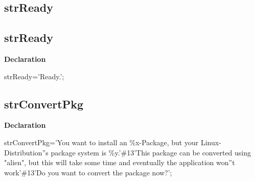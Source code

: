 \documentclass{report}
\newif\ifpdf
\begin{document}
\subsection*{\large{\textbf{strReady}}\normalsize\hspace{1ex}\hrulefill}
\else
\subsection*{strReady}
\fi
\label{trstrings-strReady}
\begin{list}{}{
\setlength{\itemindent}{0cm}
\setlength{\listparindent}{0cm}
\setlength{\leftmargin}{\evensidemargin}
\addtolength{\leftmargin}{\tmplength}
\settowidth{\labelsep}{X}
\addtolength{\leftmargin}{\labelsep}
\setlength{\labelwidth}{\tmplength}
}
\item[\textbf{Declaration}\hfill]
\ifpdf
\begin{flushleft}
\fi
\begin{ttfamily}
strReady='Ready.';\end{ttfamily}

\ifpdf
\end{flushleft}
\fi

\end{list}
\ifpdf
\subsection*{\large{\textbf{strConvertPkg}}\normalsize\hspace{1ex}\hrulefill}
\else
\subsection*{strConvertPkg}
\fi
\label{trstrings-strConvertPkg}
\begin{list}{}{
\setlength{\itemindent}{0cm}
\setlength{\listparindent}{0cm}
\setlength{\leftmargin}{\evensidemargin}
\addtolength{\leftmargin}{\tmplength}
\settowidth{\labelsep}{X}
\addtolength{\leftmargin}{\labelsep}
\setlength{\labelwidth}{\tmplength}
}
\item[\textbf{Declaration}\hfill]
\ifpdf
\begin{flushleft}
\fi
\begin{ttfamily}
strConvertPkg='You want to install an {\%}x-Package, but your Linux-Distribution''s package system is {\%}y.'{\#}13'This package can be converted using "alien", but this will take some time and eventually the application won''t work'{\#}13'Do you want to convert the package now?';\end{ttfamily}

\ifpdf
\end{flushleft}
\fi

\end{list}
\ifpdf
\end{document}
